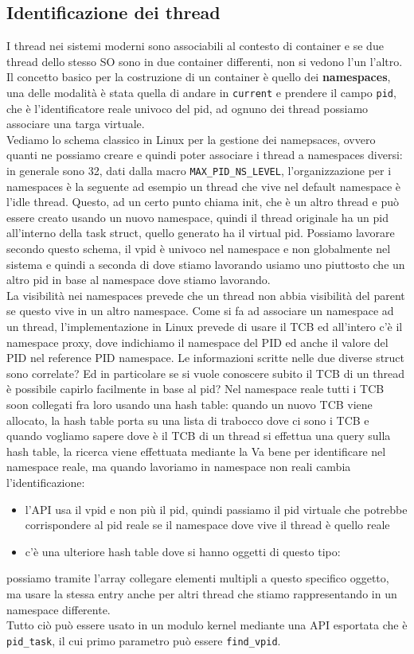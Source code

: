 \documentclass[12pt, oneside]{extbook}
\begin{document}
\subsection{Identificazione dei thread}
I thread nei sistemi moderni sono associabili al contesto di container e se due thread dello stesso SO sono in due container differenti, non si vedono l'un l'altro. Il concetto basico per la costruzione di un container è quello dei \textbf{namespaces}, una delle modalità è stata quella di andare in \texttt{current} e prendere il campo \texttt{pid}, che è l'identificatore reale univoco del pid, ad ognuno dei thread possiamo associare una targa virtuale.\\Vediamo lo schema classico in Linux per la gestione dei namepsaces, ovvero quanti ne possiamo creare e quindi poter associare i thread a namespaces diversi: in generale sono 32, dati dalla macro \texttt{MAX\_PID\_NS\_LEVEL}, l'organizzazione per i namespaces è la seguente
ad esempio un thread che vive nel default namespace è l'idle thread. Questo, ad un certo punto chiama init, che è un altro thread e può essere creato usando un nuovo namespace, quindi il thread originale ha un pid all'interno della task struct, quello generato ha il virtual pid. Possiamo lavorare secondo questo schema, il vpid è univoco nel namespace e non globalmente nel sistema e quindi a seconda di dove stiamo lavorando usiamo uno piuttosto che un altro pid in base al namespace dove stiamo lavorando.\\La visibilità nei namespaces prevede che un thread non abbia visibilità del parent se questo vive in un altro namespace. Come si fa ad associare un namespace ad un thread, l'implementazione in Linux prevede di usare il TCB ed all'intero c'è il namespace proxy, dove indichiamo il namespace del PID ed anche il valore del PID nel reference PID namespace. Le informazioni scritte nelle due diverse struct sono correlate? Ed in particolare se si vuole conoscere subito il TCB di un thread è possibile capirlo facilmente in base al pid? Nel namespace reale tutti i TCB soon collegati fra loro usando una hash table: quando un nuovo TCB viene allocato, la hash table porta su una lista di trabocco dove ci sono i TCB e quando vogliamo sapere dove è il TCB di un thread si effettua una query sulla hash table, la ricerca viene effettuata mediante la 
Va bene per identificare nel namespace reale, ma quando lavoriamo in namespace non reali cambia l'identificazione:
\begin{itemize}
\item l'API usa il vpid e non più il pid, quindi passiamo il pid virtuale che potrebbe corrispondere al pid reale se il namespace dove vive il thread è quello reale
\item c'è una ulteriore hash table dove si hanno oggetti di questo tipo:
\end{itemize}
possiamo tramite l'array collegare elementi multipli a questo specifico oggetto, ma usare la stessa entry anche per altri thread che stiamo rappresentando in un namespace differente.\\Tutto ciò può essere usato in un modulo kernel mediante una API esportata che è \texttt{pid\_task}, il cui primo parametro può essere \texttt{find\_vpid}.
\end{document}
